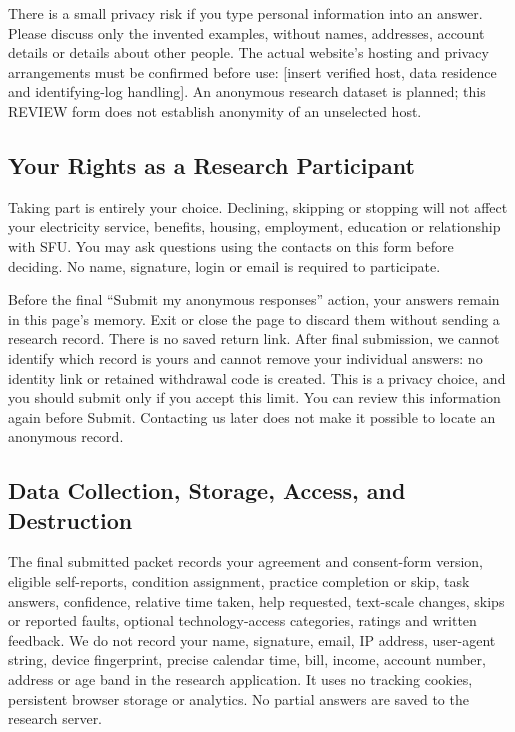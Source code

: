 \documentclass[11pt,letterpaper]{article}
\begin{document}
There is a small privacy risk if you type personal information into an answer. Please discuss only the invented examples, without names, addresses, account details or details about other people. The actual website's hosting and privacy arrangements must be confirmed before use: [insert verified host, data residence and identifying-log handling]. An anonymous research dataset is planned; this REVIEW form does not establish anonymity of an unselected host.

\subsection*{Your Rights as a Research Participant}
Taking part is entirely your choice. Declining, skipping or stopping will not affect your electricity service, benefits, housing, employment, education or relationship with SFU. You may ask questions using the contacts on this form before deciding. No name, signature, login or email is required to participate.

Before the final ``Submit my anonymous responses'' action, your answers remain in this page's memory. Exit or close the page to discard them without sending a research record. There is no saved return link. After final submission, we cannot identify which record is yours and cannot remove your individual answers: no identity link or retained withdrawal code is created. This is a privacy choice, and you should submit only if you accept this limit. You can review this information again before Submit. Contacting us later does not make it possible to locate an anonymous record.

\subsection*{Data Collection, Storage, Access, and Destruction}
The final submitted packet records your agreement and consent-form version, eligible self-reports, condition assignment, practice completion or skip, task answers, confidence, relative time taken, help requested, text-scale changes, skips or reported faults, optional technology-access categories, ratings and written feedback. We do not record your name, signature, email, IP address, user-agent string, device fingerprint, precise calendar time, bill, income, account number, address or age band in the research application. It uses no tracking cookies, persistent browser storage or analytics. No partial answers are saved to the research server.
\end{document}
